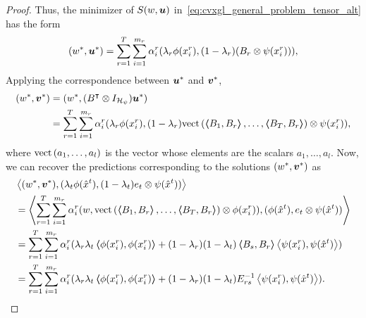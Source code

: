 \begin{proof}
    Thus, the minimizer of $S(w, \bm{u})$ in~\eqref{eq:cvxgl_general_problem_tensor_alt} has the form
    \begin{equation}
        \label{eq:repr_th_convexgl}
        (w^*, \fv{u}^*) = \sum_{r=1}^\ntasks \sum_{i=1}^{\npertask_r} \alpha_i^r (\lambda_r \phi(x_i^r), (1-\lambda_r) (B_r \otimes \psi(x_i^r))) ,
    \end{equation}
    Applying the correspondence between $\bm{u}^*$ and $\bm{v}^*$,
    \begin{equation}\nonumber
        \begin{aligned}
            (w^*, \bm{v}^*)
             & = (w^*, (B^\intercal \otimes I_{\mathcal{H}_\psi}) \bm{u}^*)                                                                                                                       \\
             & =  \sum_{r=1}^T \sum_{i=1}^{m_r} \alpha_i^r (\lambda_r \phi(x_i^r), (1 - \lambda_r)\bm{\text{vect}}\left(\bm{\left\langle} B_1, B_r \bm{\right\rangle}, \ldots, \bm{\left\langle} B_T, B_r \bm{\right\rangle}\right) \otimes \psi(x_i^r)),
        \end{aligned}
    \end{equation}
    where $\bm{\text{vect}}\left(a_1, \ldots, a_l\right)$ is the vector whose elements are the scalars $a_1, \ldots, a_l$.
    Now, we can recover the predictions corresponding to the solutions $(w^*, \bm{v}^*)$ as
    \begin{equation}
        \nonumber
        \begin{aligned}
             & \bm{\left\langle} (w^*, \bm{v}^*), (\lambda_t \phi(\hat{x}^t), (1 - \lambda_t) e_t \otimes \psi(\hat{x}^t)) \bm{\right\rangle}                                                                                                    \\
             & = \bm{\left\langle} \sum_{r=1}^T \sum_{i=1}^{m_r} \alpha_i^r (w, \bm{\text{vect}}\left(\bm{\left\langle} B_1, B_r \bm{\right\rangle}, \ldots, \bm{\left\langle} B_T, B_r \bm{\right\rangle}\right) \otimes \phi(x_i^r)), (\phi(\hat{x}^t), e_t \otimes \psi(\hat{x}^t)) \bm{\right\rangle}      \\
             & = \sum_{r=1}^T \sum_{i=1}^{m_r} \alpha_i^r  (\lambda_r \lambda_t \bm{\left\langle} \phi(x_i^r), \phi(x_i^r) \bm{\right\rangle} + (1-\lambda_r) (1 - \lambda_t) \bm{\left\langle} B_s, B_r \bm{\right\rangle} \bm{\left\langle} \psi(x_i^r), \psi(\hat{x}^t) \bm{\right\rangle}) \\
             & = \sum_{r=1}^T \sum_{i=1}^{m_r} \alpha_i^r  (\lambda_r \lambda_t \bm{\left\langle} \phi(x_i^r), \phi(x_i^r) \bm{\right\rangle} + (1-\lambda_r) (1 - \lambda_t) E_{rs}^{-1} \bm{\left\langle} \psi(x_i^r), \psi(\hat{x}^t) \bm{\right\rangle}) .
        \end{aligned}
    \end{equation}
\end{proof}
